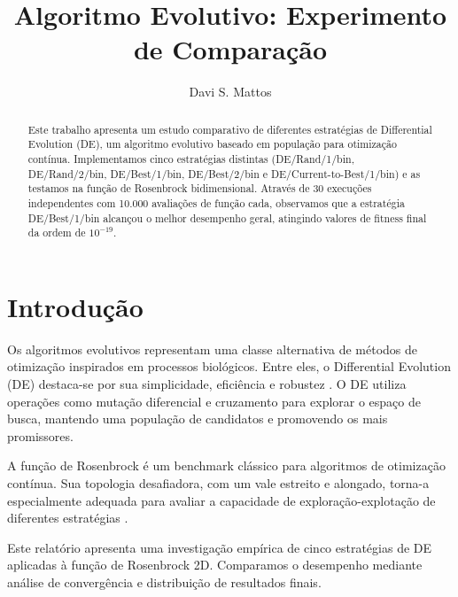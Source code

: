 \documentclass[runningheads]{llncs}
\begin{document}
%
\title{Algoritmo Evolutivo: Experimento de Comparação}
%
\author{Davi S. Mattos}
%
%
%
\maketitle

\begin{abstract}
Este trabalho apresenta um estudo comparativo de diferentes estratégias de Differential Evolution (DE), um algoritmo evolutivo baseado em população para otimização contínua. Implementamos cinco estratégias distintas (DE/Rand/1/bin, DE/Rand/2/bin, DE/Best/1/bin, DE/Best/2/bin e DE/Current-to-Best/1/bin) e as testamos na função de Rosenbrock bidimensional. Através de 30 execuções independentes com 10.000 avaliações de função cada, observamos que a estratégia DE/Best/1/bin alcançou o melhor desempenho geral, atingindo valores de fitness final da ordem de $10^{-19}$.

\end{abstract}

\section{Introdução}

Os algoritmos evolutivos representam uma classe alternativa de métodos de otimização inspirados em processos biológicos. Entre eles, o Differential Evolution (DE) destaca-se por sua simplicidade, eficiência e robustez \cite{storn1997differential}. O DE utiliza operações como mutação diferencial e cruzamento para explorar o espaço de busca, mantendo uma população de candidatos e promovendo os mais promissores.

A função de Rosenbrock é um benchmark clássico para algoritmos de otimização contínua. Sua topologia desafiadora, com um vale estreito e alongado, torna-a especialmente adequada para avaliar a capacidade de exploração-explotação de diferentes estratégias \cite{rosenbrock1960automatic}.

Este relatório apresenta uma investigação empírica de cinco estratégias de DE aplicadas à função de Rosenbrock 2D. Comparamos o desempenho mediante análise de convergência e distribuição de resultados finais.
\end{document}
